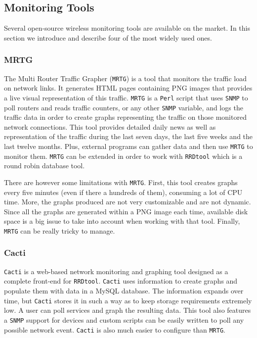 \subsection{Monitoring Tools}
Several open-source wireless monitoring tools are available on the market. In this section we introduce and describe four of the most widely used ones.

\subsubsection{MRTG}
The Multi Router Traffic Grapher (\texttt{MRTG}) \cite{mrtg} is a tool that monitors the traffic load on network links. It generates HTML pages containing PNG images that provides a live visual representation of this traffic. \texttt{MRTG} is a \texttt{Perl} script that uses \texttt{SNMP} to poll routers and reads traffic counters, or any other \texttt{SNMP} variable, and logs the traffic data in order to create graphs representing the traffic on those monitored network connections. This tool provides detailed daily news as well as representation of the traffic during the last seven days, the last five weeks and the last twelve months. Plus, external programs can gather data and then use \texttt{MRTG} to monitor them. \texttt{MRTG} can be extended in order to work with \texttt{RRDtool} \cite{rrdtool} which is a round robin database tool.

There are however some limitations with \texttt{MRTG}. First, this tool creates graphs every five minutes (even if there a hundreds of them), consuming a lot of CPU time. More, the graphs produced are not very customizable and are not dynamic. Since all the graphs are generated within a PNG image each time, available disk space is a big issue to take into account when working with that tool. Finally, \texttt{MRTG} can be really tricky to manage.

\subsubsection{Cacti}
\texttt{Cacti} \cite{cacti} is a web-based network monitoring and graphing tool designed as a complete front-end for \texttt{RRDtool}. \texttt{Cacti} uses information to create graphs and populate them with data in a MySQL database. The information expands over time, but \texttt{Cacti} stores it in such a way as to keep storage requirements extremely low. A user can poll services and graph the resulting data. This tool also features a \texttt{SNMP} support for devices and custom scripts can be easily written to poll any possible network event. \texttt{Cacti} is also much easier to configure than \texttt{MRTG}.


